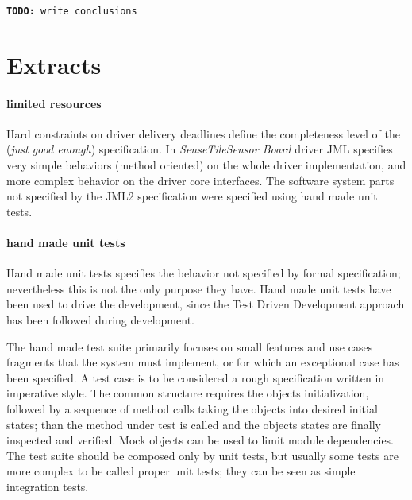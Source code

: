\documentclass{article}
\newcommand{\todo}[1]{\texttt{\textbf{TODO:} #1}}
\newcommand{\ST}{\emph{SenseTile}\xspace}
\newcommand{\SB}{\emph{Sensor Board}\xspace}
\newcommand{\STSB}{\ST \SB\xspace}
\begin{document}
\todo{write conclusions}

 


\newpage 

\section{Extracts}

\paragraph*{limited resources}

Hard constraints on driver delivery deadlines define the completeness level of the (\emph{just good enough}) specification.  
In \STSB driver JML specifies very simple behaviors (method oriented) on the whole driver implementation, and more complex behavior on the driver core interfaces.  
The software system parts not specified by the JML2 specification were specified using hand made unit tests.

\paragraph*{hand made unit tests}

Hand made unit tests specifies the behavior not specified by formal specification; nevertheless this is not the only purpose they have.
Hand made unit tests have been used to drive the development, since the Test Driven Development approach\cite{Beck2003} has been
followed during development.

The hand made test suite primarily focuses on small features and use cases fragments that the system must implement, or for which an exceptional case has been specified. 
A test case is to be considered a rough specification written in imperative style. 
The common structure requires the objects initialization, followed by a sequence of method calls taking the objects into desired initial states; than the method under test is called and the objects states are finally inspected and verified. 
Mock objects can be used to limit module dependencies. 
The test suite should be composed only by unit tests, but usually some tests are more complex to be called proper unit tests; they can be seen as simple integration tests.
\end{document}

